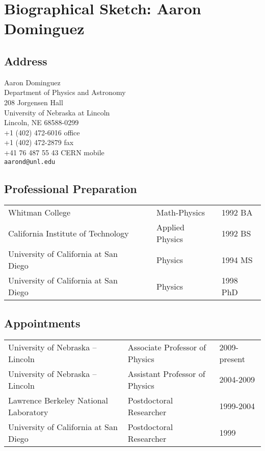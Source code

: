 \documentclass[11pt]{article}
\begin{document}
\section*{Biographical Sketch: Aaron Dominguez}
\label{sec:bio}
\subsection*{Address}
Aaron Dominguez\\
Department of Physics and Astronomy\\
208 Jorgensen Hall\\
University of Nebraska at Lincoln\\
Lincoln, NE  68588-0299\\
+1 (402) 472-6016 office\\
+1 (402) 472-2879 fax\\
+41 76 487 55 43 CERN mobile\\
{\texttt{aarond@unl.edu}}

\subsection*{Professional Preparation}
\begin{tabular}[c]{lll}
Whitman College                          & Math-Physics                     & 1992 BA\\
California Institute of Technology       & Applied Physics                  & 1992 BS\\
University of California at San Diego\ \ & Physics                          & 1994 MS\\
University of California at San Diego\ \ & Physics                          & 1998 PhD\\
\end{tabular}


\subsection*{Appointments}
\begin{tabular}[c]{lll}
University of Nebraska -- Lincoln          & Associate Professor of
Physics & 2009-present \\
University of Nebraska -- Lincoln          & Assistant Professor of
Physics & 2004-2009 \\
Lawrence Berkeley National Laboratory\ \ & Postdoctoral Researcher & 1999-2004\\
University of California at San Diego\ \ & Postdoctoral Researcher & 1999
\end{tabular}
\end{document}
